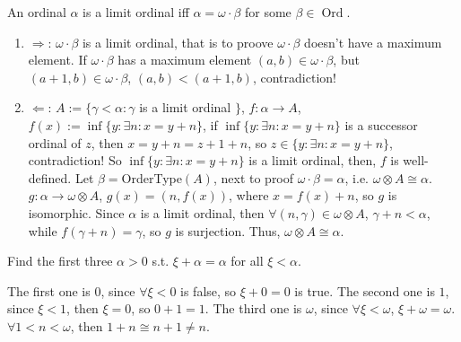 \documentclass{ctexart}
\DeclareMathOperator{\ord}{Ord}
\begin{document}
\begin{problem}
An ordinal $\alpha$ is a limit ordinal iff $\alpha=\omega \cdot \beta$ for some $\beta \in\ord$.
\end{problem}
\begin{solution}
    \begin{enumerate}
        \item $\Rightarrow$: $\omega\cdot \beta$ is a limit ordinal, that is to proove $\omega\cdot \beta$ doesn't have a maximum element. If $\omega\cdot \beta$ has a maximum element $(a,b)\in \omega\cdot \beta$, but $(a+1,b)\in\omega\cdot \beta$, $(a,b)<(a+1,b)$, contradiction!
        \item $\Leftarrow$: $A:=\{\gamma < \alpha:\gamma$ is a limit ordinal $\}$, $f: \alpha\to A$, $f(x):=\inf\{y:\exists n: x=y+n\}$, if $\inf\{y:\exists n: x=y+n\}$ is a successor ordinal of $z$, then $x=y+n=z+1+n$, so $z\in\{y:\exists n: x=y+n\}$, contradiction! So $\inf\{y:\exists n: x=y+n\}$ is a limit ordinal, then, $f$ is well-defined. Let $\beta=$OrderType$(A)$, next to proof $\omega \cdot \beta=\alpha$, i.e. $\omega \otimes A\cong\alpha$. $g: \alpha \to\omega \otimes A$, $g(x)=(n,f(x))$, where $x=f(x)+n$, so $g$ is isomorphic. Since $\alpha$ is a limit ordinal, then $\forall (n,\gamma)\in \omega\otimes A$, $\gamma+n<\alpha$, while $f(\gamma+n)=\gamma$, so $g$ is surjection. Thus, $\omega \otimes A\cong\alpha$.
    \end{enumerate}
\end{solution}



\begin{problem}
Find the first three $\alpha>0$ s.t. $\xi+\alpha=\alpha$ for all $\xi<\alpha$.
\end{problem}
\begin{solution}
    The first one is $0$, since $\forall \xi< 0$ is false, so $\xi+0=0$ is true.
    The second one is $1$, since $\xi<1$, then $\xi=0$, so $0+1=1$.
    The third one is $\omega$, since $\forall \xi<\omega$, $\xi+\omega=\omega$. $\forall 1<n< \omega$, then $1+n\cong n+1\neq n$.
\end{solution}
\end{document}
